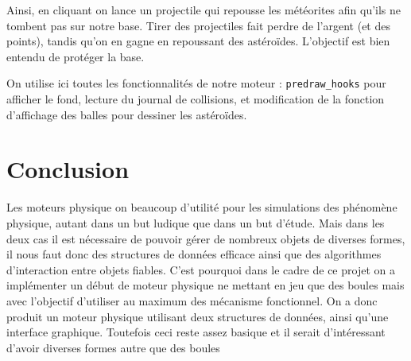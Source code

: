 \documentclass[a4paper]{scrartcl}
\begin{document}
Ainsi, en cliquant on lance un projectile qui repousse les météorites
afin qu'ils ne tombent pas sur notre base. Tirer des projectiles fait
perdre de l'argent (et des points), tandis qu'on en gagne en
repoussant des astéroïdes. L'objectif est bien entendu de protéger la
base.

On utilise ici toutes les fonctionnalités de notre moteur :
\texttt{predraw\_hooks} pour afficher le fond, lecture du journal de
collisions, et modification de la fonction d'affichage des balles pour
dessiner les astéroïdes.

\section*{Conclusion}

Les moteurs physique on beaucoup d'utilité pour les simulations des phénomène physique, autant dans un but ludique que dans un but d'étude. Mais dans les deux cas il est nécessaire de pouvoir gérer de nombreux objets de diverses formes, il nous faut donc des structures de données efficace ainsi que des algorithmes d'interaction entre objets fiables. C'est pourquoi dans le cadre de ce projet on a implémenter un début de moteur physique ne mettant en jeu que des boules mais avec l'objectif d'utiliser au maximum des mécanisme fonctionnel. On a donc produit un moteur physique utilisant deux structures de données, ainsi qu'une interface graphique. Toutefois ceci reste assez basique et il serait d'intéressant d'avoir diverses formes autre que des boules
\end{document}
